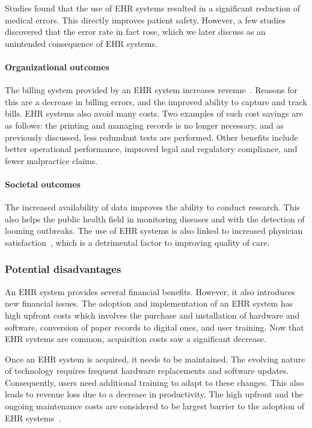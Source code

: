         Studies found that the use of EHR systems resulted in a significant reduction of medical errors. This directly improves patient safety. However, a few studies discovered that the error rate in fact rose, which we later discuss as an unintended consequence of EHR systems.

        \paragraph{Organizational outcomes} The billing system provided by an EHR system increases revenue~\cite{Menachemi2011}. Reasons for this are a decrease in billing errors, and the improved ability to capture and track bills. EHR systems also avoid many costs. Two examples of such cost savings are as follows: the printing and managing records is no longer necessary, and as previously discussed, less redundant tests are performed. Other benefits include better operational performance, improved legal and regulatory compliance, and fewer malpractice claims.

        \paragraph{Societal outcomes} The increased availability of data improves the ability to conduct research. This also helps the public health field in monitoring diseases and with the detection of looming outbreaks. The use of EHR systems is also linked to increased physician satisfaction~\cite{Menachemi2009}, which is a detrimental factor to improving quality of care.

        \subsubsection{Potential disadvantages}\label{ehrs_disadvantages}

        An EHR system provides several financial benefits. However, it also introduces new financial issues. The adoption and implementation of an EHR system has high upfront costs which involves the purchase and installation of hardware and software, conversion of paper records to digital ones, and user training. Now that EHR systems are common, acquisition costs saw a significant decrease.

        Once an EHR system is acquired, it needs to be maintained. The evolving nature of technology requires frequent hardware replacements and software updates. Consequently, users need additional training to adapt to these changes. This also leads to revenue loss due to a decrease in productivity. The high upfront and the ongoing maintenance costs are considered to be largest barrier to the adoption of EHR systems~\cite{Menachemi2006}.

